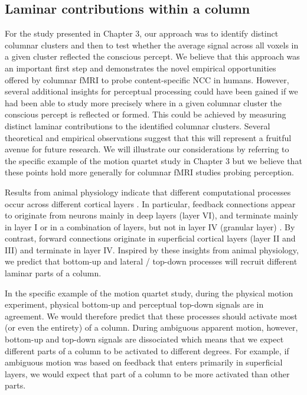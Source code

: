 \subsection{Laminar contributions within a column}
For the study presented in Chapter 3, our approach was to identify distinct columnar clusters and then to test whether the average signal across all voxels in a given cluster reflected the conscious percept. We believe that this approach was an important first step and demonstrates the novel empirical opportunities offered by columnar fMRI to probe content-specific NCC in humans. However, several additional insights for perceptual processing could have been gained if we had been able to study more precisely where in a given columnar cluster the conscious percept is reflected or formed. This could be achieved by measuring distinct laminar contributions to the identified columnar clusters. Several theoretical and empirical observations suggest that this will represent a fruitful avenue for future research. We will illustrate our considerations by referring to the specific example of the motion quartet study in Chapter 3 but we believe that these points hold more generally for columnar fMRI studies probing perception.

Results from animal physiology indicate that different computational processes occur across different cortical layers \parencite{Felleman1991, Rockland1979, Markov2014}. In particular, feedback connections appear to originate from neurons mainly in deep layers (layer VI), and terminate mainly in layer I or in a combination of layers, but not in layer IV (granular layer) \parencite{Rockland1994, Salin2017}. By contrast, forward connections originate in superficial cortical layers (layer II and III) and terminate in layer IV. Inspired by these insights from animal physiology, we predict that bottom-up and lateral / top-down processes will recruit different laminar parts of a column.

In the specific example of the motion quartet study, during the physical motion experiment, physical bottom-up and perceptual top-down signals are in agreement. We would therefore predict that these processes should activate most (or even the entirety) of a column. During ambiguous apparent motion, however, bottom-up and top-down signals are dissociated which means that we expect different parts of a column to be activated to different degrees. For example, if ambiguous motion was based on feedback that enters primarily in superficial layers, we would expect that part of a column to be more activated than other parts.

